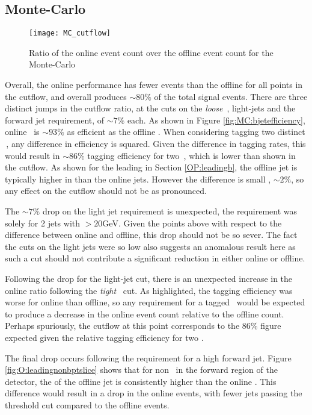 	\subsection{Monte-Carlo}
		\begin{figure}[h]
			\centering
			\texttt{[image: MC\_cutflow]}
			\caption[\VBFHBB\ Cutflow ratio for Monte-Carlo simulation]{Ratio of the online event count over the offline event count for the Monte-Carlo}
			\label{f:cutflowMC}
		\end{figure}

	Overall, the online performance has fewer events than the offline for all points in the cutflow, and overall produces $\sim80\%$ of the total signal events. There are three distinct jumps in the cutflow ratio, at the cuts on the \textit{loose} \bjets\,, light-jets and the forward jet requirement, of $\sim7\%$ each. As shown in Figure \ref{fig:MC:bjetefficiency}, online \btag\, is $\sim93\%$ as efficient as the offline \btag. When considering tagging two distinct \bjets\,, any difference in efficiency is squared. Given the difference in tagging rates, this would result in $\sim86\%$ tagging efficiency for two \bjets\,, which is lower than shown in the cutflow. As shown for the leading \bjet in Section \ref{OP:leadingb}, the offline jet is typically higher in \pt than the online jets. However the difference is small , $\sim2\%$, so any effect on the cutflow should not be as pronounced.

	The $\sim7\%$ drop on the light jet requirement is unexpected, the requirement was solely for 2 jets with \pt$>20$GeV. Given the points above with respect to the \pt difference between online and offline, this drop should not be so sever. The fact the \pt cuts on the light jets were so low also suggests an anomalous result here as such a cut should not contribute a significant reduction in either online or offline.

	Following the drop for the light-jet cut, there is an unexpected increase in the online ratio following the \textit{tight} \btagging\, cut. As highlighted, the tagging efficiency was worse for online than offline, so any requirement for a tagged \bjet\, would be expected to produce a decrease in the online event count relative to the offline count. Perhaps spuriously, the cutflow at this point corresponds to the $86\%$ figure expected given the relative tagging efficiency for two \bjets.

	The final drop occurs following the requirement for a high \pt forward jet. Figure \ref{fig:O:leadingnonbptslice} shows that for non \bjets\, in the forward region of the detector, the \pt of the offline jet is consistently higher than the online \pt. This difference would result in a drop in the online events, with fewer jets passing the threshold \pt cut compared to the offline events.

